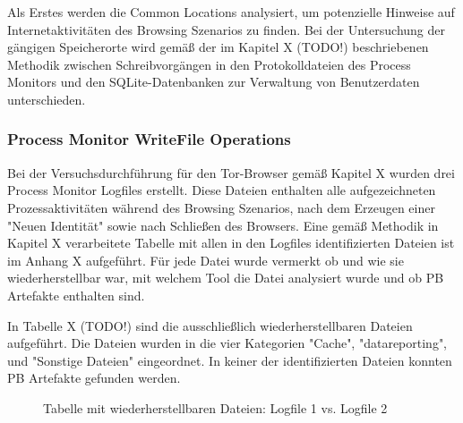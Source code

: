 Als Erstes werden die Common Locations analysiert, um potenzielle Hinweise auf Internetaktivitäten des Browsing Szenarios zu finden. Bei der Untersuchung der gängigen Speicherorte wird gemäß der im Kapitel X (TODO!) beschriebenen Methodik zwischen Schreibvorgängen in den Protokolldateien des Process Monitors und den SQLite-Datenbanken zur Verwaltung von Benutzerdaten unterschieden.

\subsubsection*{Process Monitor WriteFile Operations}

Bei der Versuchsdurchführung für den Tor-Browser gemäß Kapitel X wurden drei Process Monitor Logfiles erstellt.
Diese Dateien enthalten alle aufgezeichneten Prozessaktivitäten während des Browsing Szenarios, nach dem Erzeugen einer "Neuen Identität" sowie nach Schließen des Browsers.
Eine gemäß Methodik in Kapitel X verarbeitete Tabelle mit allen in den Logfiles identifizierten Dateien ist im Anhang X aufgeführt.
Für jede Datei wurde vermerkt ob und wie sie wiederherstellbar war, mit welchem Tool die Datei analysiert wurde und ob PB Artefakte enthalten sind.

In Tabelle X (TODO!) sind die ausschließlich wiederherstellbaren Dateien aufgeführt.
Die Dateien wurden in die vier Kategorien "Cache", "datareporting", und "Sonstige Dateien" eingeordnet.
In keiner der identifizierten Dateien konnten PB Artefakte gefunden werden.

\begin{figure}[h!]
	\caption{Tabelle mit wiederherstellbaren Dateien: Logfile 1 vs. Logfile 2}
\end{figure}

